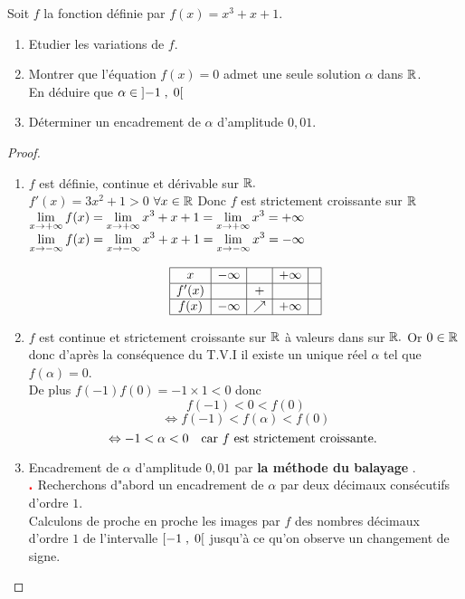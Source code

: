 \begin{example}
\begin{exercice}
Soit $ f $ la fonction définie par $ f(x)= x^{3}+x+1 $.
 \begin{enumerate}
\item Etudier les variations  de $ f $.
\item Montrer que  l'équation $ f(x)=0 $ admet une seule solution $ \alpha$ dans $\mathbb{R} $.\\ En déduire que $ \alpha\in\left]-1 \;,\; 0\right[ $
\item  Déterminer un encadrement de $ \alpha $ d'amplitude $ 0,01 $.
\end{enumerate}
\end{exercice}
\begin{proof}
 \begin{enumerate}
\item $ f $ est définie, continue et dérivable sur $ \mathbb{R}. $\\
$ f'(x) = 3x^{2}+1 > 0$  $\forall x\in \mathbb{R} $ Donc $ f $ est strictement croissante  sur $ \mathbb{R} $ \\
$ \displaystyle\lim_{x \to +\infty}f(x)=\displaystyle \lim_{x \to +\infty}x^{3}+x+1=\displaystyle\lim_{x \to +\infty}x^{3}=+\infty$\\
$\displaystyle \lim_{x \to -\infty}f(x)=\displaystyle \lim_{x \to -\infty}x^{3}+x+1=\displaystyle\lim_{x \to -\infty}x^{3}=-\infty$

$$
\begin{array}{|c|c|c|c|c|}
\hline
x & -\infty & & +\infty & \\
\hline
f'(x) & & + & & \\
\hline
f(x) & -\infty & \nearrow & +\infty & \\
\hline
\end{array}
$$

\item $ f $ est continue et strictement croissante sur $ \mathbb{R}$ à valeurs dans sur $ \mathbb{R}. $ Or $ 0\in \mathbb{R} $ donc d'après la conséquence  du T.V.I il existe un unique réel $ \alpha $ tel que $ f(\alpha)=0 $.\\ De plus $ f(-1)f(0)=-1\times 1 < 0$ donc $$  f(-1)<0<f(0) $$ $$ \Leftrightarrow f(-1)<f(\alpha)<f(0) $$ $$ \Leftrightarrow -1<\alpha< 0 \quad \textrm{car $ f $ est strictement croissante. }$$
\item Encadrement de $ \alpha $ d'amplitude $ 0,01 $ par \textbf{la méthode du balayage }.\\
$ \color{red}\centerdot $ Recherchons d"abord un encadrement de $ \alpha $ par deux décimaux consécutifs d'ordre $ 1. $\\
Calculons de proche en proche les images par $ f $  des nombres décimaux d'ordre $ 1 $ de l'intervalle $ \left[-1 \;,\; 0\right[ $ jusqu'à ce qu'on observe un changement de signe.



\end{enumerate}
\end{proof}
\end{example}
